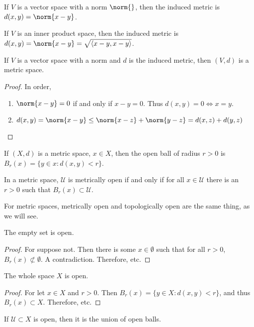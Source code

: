 \documentclass[crop=false,class=book]{standalone}
\begin{document}
\begin{definition}
If $V$ is a vector space with a norm $\norm{}$, then the induced metric is $d(x,y) = \norm{x-y}$.
\end{definition}
\begin{remark}
If $V$ is an inner product space, then the induced metric is $d(x,y) = \norm{x-y} = \sqrt{\langle x-y,x-y\rangle }$.
\end{remark}
\begin{theorem}
If $V$ is a vector space with a norm and $d$ is the induced metric, then $(V,d)$ is a metric space.
\end{theorem}
\begin{proof}
In order,
\begin{enumerate}
\item $\norm{x-y} = 0$ if and only if $x-y = 0$. Thus $d(x,y) = 0 \Leftrightarrow x=y$.
\item $d(x,y) = \norm{x-y}\leq \norm{x-z}+\norm{y-z} = d(x,z)+d(y,z)$
\end{enumerate}
\end{proof}
\begin{definition}
If $(X,d)$ is a metric space, $x\in X$, then the open ball of radius $r>0$ is $B_{r}(x) = \{y\in x: d(x,y)<r\}$.
\end{definition}
\begin{definition}
In a metric space, $\mathcal{U}$ is metrically open if and only if for all $x\in \mathcal{U}$ there is an $r>0$ such that $B_{r}(x)\subset \mathcal{U}$.
\end{definition}
\begin{remark}
For metric spaces, metrically open and topologically open are the same thing, as we will see.
\end{remark} 
\begin{theorem}
The empty set is open.
\end{theorem}
\begin{proof}
For suppose not. Then there is some $x\in \emptyset$ such that for all $r>0$, $B_{r}(x)\not\subset \emptyset$. A contradiction. Therefore, etc.
\end{proof}
\begin{theorem}
The whole space $X$ is open.
\end{theorem}
\begin{proof}
For let $x\in X$ and $r>0$. Then $B_{r}(x) = \{y\in X:d(x,y)<r\}$, and thus $B_{r}(x)\subset X$. Therefore, etc.
\end{proof}
\begin{theorem}
If $\mathcal{U}\subset X$ is open, then it is the union of open balls.
\end{theorem}
\end{document}
